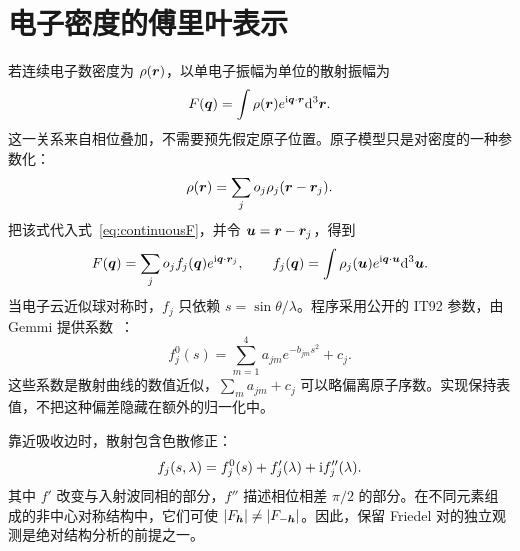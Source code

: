 \section{电子密度的傅里叶表示}
若连续电子数密度为 $\rho(\bm{r})$，以单电子振幅为单位的散射振幅为
\begin{equation}
F(\bm{q})=\int\rho(\bm{r})e^{\mathrm{i}\bm{q}\cdot\bm{r}}\mathrm{d}^3\bm{r}.
\label{eq:continuousF}
\end{equation}
这一关系来自相位叠加，不需要预先假定原子位置。原子模型只是对密度的一种参数化：
\begin{equation}
\rho(\bm{r})=\sum_j o_j\rho_j(\bm{r}-\bm{r}_j).
\end{equation}
把该式代入式~\eqref{eq:continuousF}，并令 $\bm{u}=\bm{r}-\bm{r}_j$，得到
\begin{equation}
F(\bm{q})=\sum_j o_j f_j(\bm{q})e^{\mathrm{i}\bm{q}\cdot\bm{r}_j},\qquad
f_j(\bm{q})=\int\rho_j(\bm{u})e^{\mathrm{i}\bm{q}\cdot\bm{u}}\mathrm{d}^3\bm{u}.
\end{equation}
当电子云近似球对称时，$f_j$ 只依赖 $s=\sin\theta/\lambda$。程序采用公开的 IT92 参数，由 Gemmi 提供系数~\cite{gemmi_scattering}：
\begin{equation}
f_j^0(s)=\sum_{m=1}^{4}a_{jm}e^{-b_{jm}s^2}+c_j.
\label{eq:it92}
\end{equation}
这些系数是散射曲线的数值近似，$\sum_ma_{jm}+c_j$ 可以略偏离原子序数。实现保持表值，不把这种偏差隐藏在额外的归一化中。

靠近吸收边时，散射包含色散修正：
\begin{equation}
f_j(s,\lambda)=f_j^0(s)+f'_j(\lambda)+\mathrm{i} f''_j(\lambda).
\label{eq:anomalous}
\end{equation}
其中 $f'$ 改变与入射波同相的部分，$f''$ 描述相位相差 $\pi/2$ 的部分。在不同元素组成的非中心对称结构中，它们可使 $|F_{\bm{h}}|\ne|F_{-\bm{h}}|$。因此，保留 Friedel 对的独立观测是绝对结构分析的前提之一。

